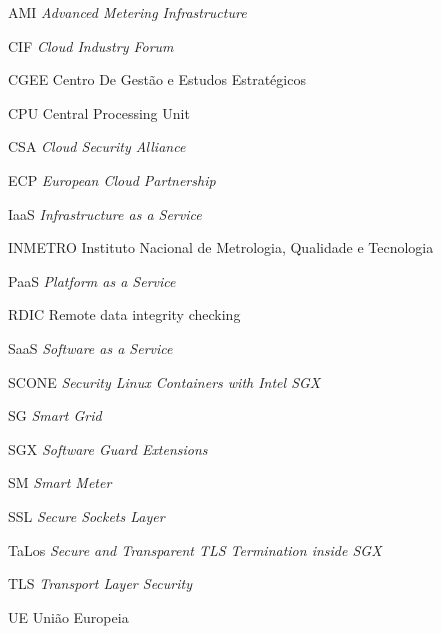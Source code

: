 \documentclass[
	12pt,					%
	oneside,					%
	a4paper,					%
	chapter=TITLE,			%
	section=TITLE,			%
	sumario=tradicional,
	english,					%
	brazil					%
	]{abntex2}
\begin{document}
\frenchspacing

\pretextual



\imprimirfolhaderosto*





%

%





\listoffigures*
\cleardoublepage

\listoftables*
\cleardoublepage

\begin{siglas}

  \item[AMI]\textit{Advanced Metering Infrastructure}
  \item[CIF]\textit{Cloud Industry Forum}
  \item[CGEE]{Centro De Gestão e Estudos Estratégicos}
  \item[CPU]{Central Processing Unit}
  \item[CSA]\textit{Cloud Security Alliance} 
  \item[ECP]\textit{European Cloud Partnership}
  \item[IaaS]\textit{Infrastructure as a Service}
  \item[INMETRO]{Instituto Nacional de Metrologia, Qualidade e Tecnologia}
  \item[PaaS]\textit{Platform as a Service}
  \item[RDIC]Remote data integrity checking
  \item[SaaS]\textit{Software as a Service}
  \item[SCONE]\textit{Security Linux Containers with Intel SGX}
  \item[SG]\textit{Smart Grid}
  \item[SGX]\textit{Software Guard Extensions}
  \item[SM]\textit{Smart Meter}
  \item[SSL]\textit{Secure Sockets Layer}
  \item[TaLos]\textit{Secure and Transparent TLS Termination inside SGX}
  \item[TLS]\textit{Transport Layer Security}
  \item[UE]{União Europeia}
  
\end{siglas}
\end{document}

